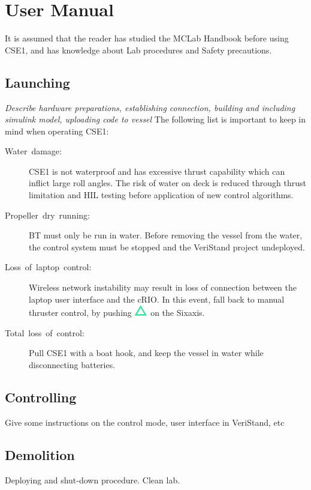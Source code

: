 \part{User Manual}\label{part2}
It is assumed that the reader has studied the MCLab Handbook before using CSE1, and has knowledge about Lab procedures and Safety precautions. 
\chapter{Launching}
\textit{Describe hardware preparations, establishing connection, building and including simulink model, uploading code to vessel}
The following list is important to keep in mind when operating CSE1:
\begin{description}
	\item [{Water~damage:}] CSE1 is not waterproof and has excessive thrust capability which can inflict large roll angles. The risk of water on deck is reduced through thrust limitation and HIL testing before application of new control algorithms. 
	\item [{Propeller~dry~running:}] BT must only be run in water. Before removing the vessel from the water, the control system must be stopped and the VeriStand project undeployed.
	\item [{Loss~of~laptop~control:}] Wireless network instability may result in loss of connection between the laptop user interface and the cRIO. In this event, fall back to manual thruster control, by pushing \includegraphics[scale=0.4]{fig/sixaxis_triangle} on the Sixaxis.
	\item [{Total~loss~of~control:}] Pull CSE1 with a boat hook, and keep the vessel in water while disconnecting batteries.
\end{description}


\chapter{Controlling}
Give some instructions on the control mode, user interface in VeriStand, etc
\chapter{Demolition}
Deploying and shut-down procedure. Clean lab. 